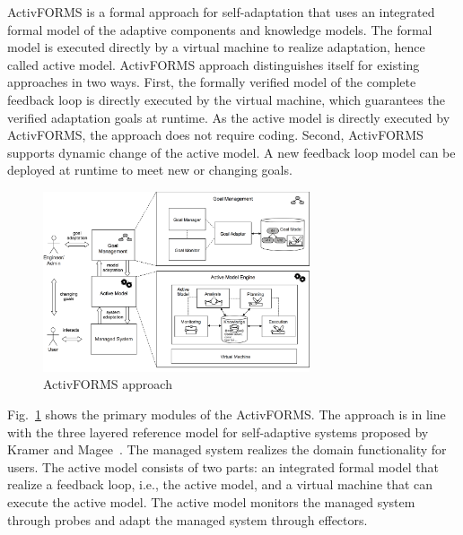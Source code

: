 ActivFORMS is a formal approach for self-adaptation that uses an integrated formal model of the adaptive components and knowledge models. The formal model is executed directly by a virtual machine to realize adaptation, hence called active model. ActivFORMS approach distinguishes itself for existing approaches in two ways. First, the formally verified model of the complete feedback loop is directly executed by the virtual machine, which guarantees the verified adaptation goals at runtime. As the active model is directly executed by ActivFORMS, the approach does not require coding. Second, ActivFORMS supports dynamic change of the active model. A new feedback loop model can be deployed at runtime to meet new or changing goals. 

\begin{figure}[t!]
	\centering
	\includegraphics[width=0.7\textwidth]{figures/ActivFORMS-approach.png}
	\caption{ActivFORMS approach}\label{fig:activforms}
\end{figure}

Fig.~\ref{fig:activforms} shows the primary modules of the ActivFORMS. The approach is in line with the three layered reference model for self-adaptive systems proposed by Kramer and Magee~\cite{kramer2007sms}. The managed system realizes the domain functionality for users. 
The active model consists of two parts: an integrated formal model that realize a feedback loop, i.e., the active model, and a virtual machine that can execute the active model. The active model monitors the managed system through probes and adapt the managed system through effectors. 

